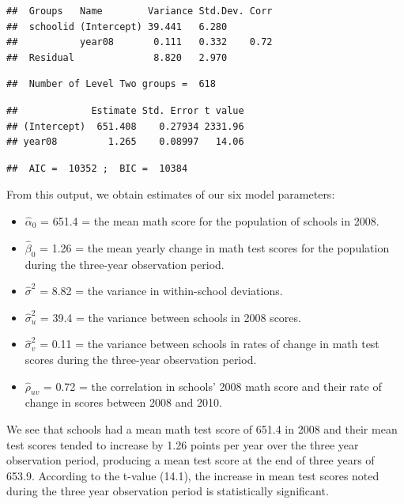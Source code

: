 \documentclass[
]{krantz}
\providecommand{\tightlist}{%
  \setlength{\itemsep}{0pt}\setlength{\parskip}{0pt}}
\begin{document}
\begin{verbatim}
##  Groups   Name        Variance Std.Dev. Corr
##  schoolid (Intercept) 39.441   6.280        
##           year08       0.111   0.332    0.72
##  Residual              8.820   2.970
\end{verbatim}

\begin{verbatim}
##  Number of Level Two groups =  618
\end{verbatim}

\begin{verbatim}
##             Estimate Std. Error t value
## (Intercept)  651.408    0.27934 2331.96
## year08         1.265    0.08997   14.06
\end{verbatim}

\begin{verbatim}
##  AIC =  10352 ;  BIC =  10384
\end{verbatim}

From this output, we obtain estimates of our six model parameters:

\begin{itemize}
\tightlist
\item
  \(\hat{\alpha}_{0}\) = 651.4 = the mean math score for the population of schools in 2008.
\item
  \(\hat{\beta}_{0}\) = 1.26 = the mean yearly change in math test scores for the population during the three-year observation period.
\item
  \(\hat{\sigma}^2\) = 8.82 = the variance in within-school deviations.
\item
  \(\hat{\sigma}^2_u\) = 39.4 = the variance between schools in 2008 scores.
\item
  \(\hat{\sigma}^2_v\) = 0.11 = the variance between schools in rates of change in math test scores during the three-year observation period.
\item
  \(\hat{\rho}_{uv}\) = 0.72 = the correlation in schools' 2008 math score and their rate of change in scores between 2008 and 2010.
\end{itemize}

We see that schools had a mean math test score of 651.4 in 2008 and their mean test scores tended to increase by 1.26 points per year over the three year observation period, producing a mean test score at the end of three years of 653.9. According to the t-value (14.1), the increase in mean test scores noted during the three year observation period is statistically significant.
\end{document}

